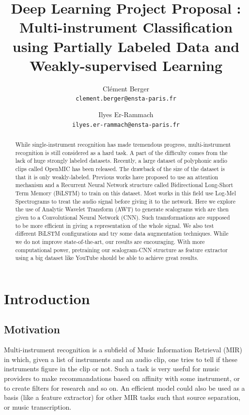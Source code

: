\documentclass[final]{cvpr}
\begin{document}
\title{Deep Learning Project Proposal : Multi-instrument Classification using Partially Labeled Data and Weakly-supervised Learning}

\author{
	Clément Berger\\
	{\tt\small clement.berger@ensta-paris.fr}
\and Ilyes Er-Rammach\\
{\tt\small ilyes.er-rammach@ensta-paris.fr}

}

\maketitle
\begin{abstract}
	While single-instrument recognition has made tremendous progress, multi-instrument recognition is still considered as a hard task. A part of the difficulty comes from the lack of huge strongly labeled datasets. Recently, a large dataset of polyphonic audio clips called OpenMIC has been released. The drawback of the size of the dataset is that it is only weakly-labeled. Previous works have proposed to use an attention mechanism and a Recurrent Neural Network structure called Bidirectional Long-Short Term Memory (BiLSTM) to train on this dataset. Most works in this field use Log-Mel Spectrograms to treat the audio signal before giving it to the network. Here we explore the use of Analytic Wavelet Transform (AWT) to generate scalograms wich are then given to a Convolutional Neural Network (CNN). Such transformations are supposed to be more efficient in giving a representation of the whole signal. We also test different BiLSTM configurations and try some data augmentation techniques. While we do not improve state-of-the-art, our results are encouraging. With more computational power, pretraining our scalogram-CNN structure as feature extractor using a big dataset like YouTube should be able to achieve great results.
\end{abstract}
\section{Introduction}
\subsection{Motivation}
Multi-instrument recognition is a subfield of Music Information Retrieval (MIR) in which, given a list of instruments and an audio clip, one tries to tell if these instruments figure in the clip or not. Such a task is very useful for music providers to make recommandations based on affinity with some instrument, or to create filters for research and so on. An efficient model could also be used as a basis (like a feature extractor) for other MIR tasks such that source separation, or music transcription.
\end{document}
